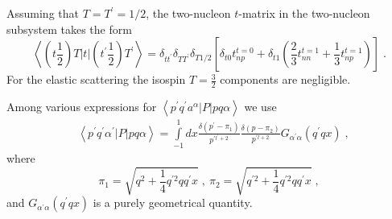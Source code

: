 Assuming that $T = T^{\prime} = 1/2$, the two-nucleon $t$-matrix in the two-nucleon subsystem takes the form~\cite{witaa1989nucleon,witala2016role}
\begin{equation}
\left<\left(t\frac{1}{2}\right)T|t|\left(t^{\prime}\frac{1}{2}\right)T^{\prime}\right> = \delta_{tt^{\prime}}\delta_{TT^{\prime}}\delta_{T 1/2}\left[\delta_{t0}t^{t=0}_{np} + \delta_{t1}\left(\frac{2}{3}t^{t=1}_{nn} + \frac{1}{3}t^{t=1}_{np}\right)\right]\;.
\end{equation}
For the elastic scattering the isospin $T = \frac{3}{2}$ components are negligible.

Among various expressions for $\left< p^{\prime}q^{\prime}a^{\alpha}|P|pq\alpha \right>$ we use~\cite{Glockle1996}
\begin{equation}
\begin{split}
&\left<p^{\prime} q^{\prime}\alpha^{\prime}|P|pq\alpha\right> = \int\limits_{-1}^{1}dx\frac{\delta (p^{\prime} - \pi_{1})}{p^{\prime l^{\prime} + 2}}\frac{\delta (p - \pi_{2})}{p^{\prime l + 2}}G_{\alpha^{\prime}\alpha}(q^{\prime}q x)\;,
\end{split}
\label{permutation1}
\end{equation}
where 
\begin{equation}
\pi_{1} = \sqrt{q^{2} + \frac{1}{4}q^{\prime 2} qq^{\prime}x}\;,~\pi_{2} = \sqrt{q^{\prime 2} + \frac{1}{4}q^{\prime 2} qq^{\prime}x}\;,
\end{equation}
and $G_{\alpha^{\prime}\alpha}(q^{\prime}q x)$ is a purely geometrical quantity.

